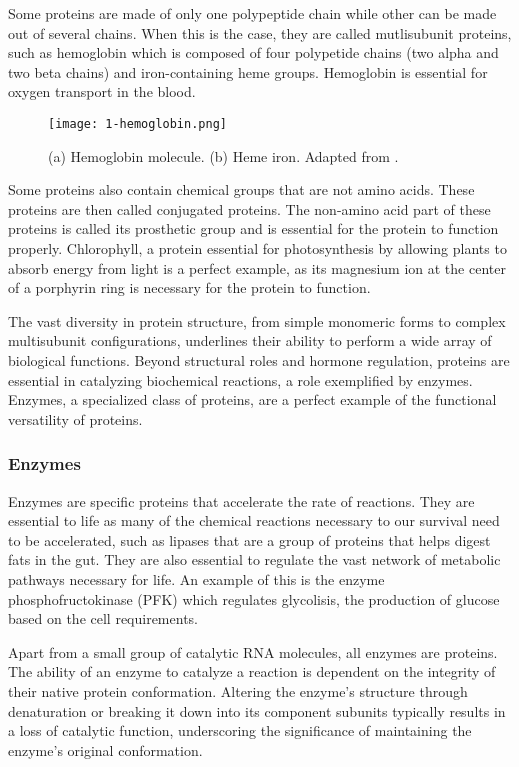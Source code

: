 Some proteins are made of only one polypeptide chain while other can be made out of several chains. When this is the case, they are called mutlisubunit proteins, such as hemoglobin which is composed of four polypetide chains (two alpha and two beta chains) and iron-containing heme groups. \cite{Perutz1970} Hemoglobin is essential for oxygen transport in the blood.

\begin{figure}
  \centering
  \texttt{[image: 1-hemoglobin.png]}
  \caption{(a) Hemoglobin molecule. (b) Heme iron. Adapted from \citeauthor{ALevelBiologyHemoglobin}.}
  \label{fig:hemoglobin}
\end{figure}

Some proteins also contain chemical groups that are not amino acids. These proteins are then called conjugated proteins. The non-amino acid part of these proteins is called its prosthetic group and is essential for the protein to function properly. Chlorophyll, a protein essential for photosynthesis by allowing plants to absorb energy from light is a perfect example, as its magnesium ion at the center of a porphyrin ring is necessary for the protein to function. \cite{Photosynthesis}

The vast diversity in protein structure, from simple monomeric forms to complex multisubunit 
configurations, underlines their ability to perform a wide array of biological functions. 
Beyond structural roles and hormone regulation, proteins are essential in catalyzing biochemical 
reactions, a role exemplified by enzymes. Enzymes, a specialized class of proteins, are a perfect example of the functional versatility of proteins. 

\subsubsection{Enzymes}
\label{section:enzyme}
Enzymes are specific proteins that accelerate the rate of reactions. They are essential to life as many
of the chemical reactions necessary to our survival need to be accelerated, such as lipases that are 
a group of proteins that helps digest fats in the gut. \cite{Pirahanchi2023Lipase} 
They are also essential to regulate the vast network of metabolic pathways necessary for life. An example
of this is the enzyme phosphofructokinase (PFK) which regulates glycolisis, the production of glucose
based on the cell requirements. \cite{Kanai2019Phosphofructokinase}

Apart from a small group of catalytic RNA molecules, all enzymes are proteins. The ability of an enzyme to catalyze a reaction is dependent on the integrity of their native protein conformation. Altering the enzyme's structure through denaturation or breaking it down into its component subunits typically results in a loss of catalytic function, underscoring the significance of maintaining the enzyme's original conformation.

